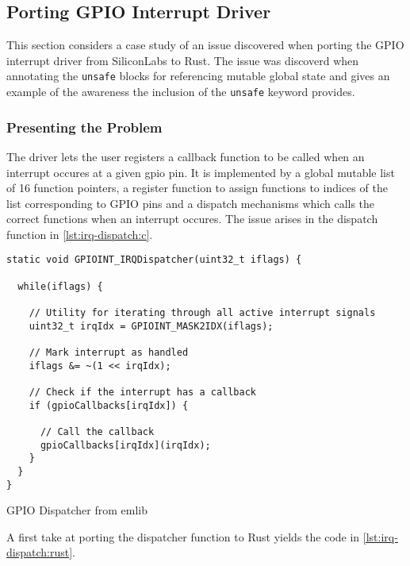 \subsection{Porting GPIO Interrupt Driver}

This section considers a case study of an issue discovered when porting the GPIO interrupt driver from SiliconLabs to Rust.
The issue was discoverd when annotating the \texttt{unsafe} blocks for referencing mutable global state and gives an example of the awareness the inclusion of the \texttt{unsafe} keyword provides.

\subsubsection{Presenting the Problem}

The driver lets the user registers a callback function to be called when an interrupt occures at a given gpio pin.
It is implemented by a global mutable list of 16 function pointers, a register function to assign functions to indices of the list corresponding to GPIO pins and a dispatch mechanisms which calls the correct functions when an interrupt occures.
The issue arises in the dispatch function in \autoref{lst:irq-dispatch:c}.

\begin{listing}
  \begin{verbatim}
static void GPIOINT_IRQDispatcher(uint32_t iflags) {

  while(iflags) {

    // Utility for iterating through all active interrupt signals
    uint32_t irqIdx = GPIOINT_MASK2IDX(iflags);

    // Mark interrupt as handled
    iflags &= ~(1 << irqIdx);

    // Check if the interrupt has a callback
    if (gpioCallbacks[irqIdx]) {

      // Call the callback
      gpioCallbacks[irqIdx](irqIdx);
    }
  }
}
  \end{verbatim}
  \caption{GPIO Dispatcher from emlib}
  \label{lst:irq-dispatch:c}
\end{listing}

A first take at porting the dispatcher function to Rust yields the code in \autoref{lst:irq-dispatch:rust}.

